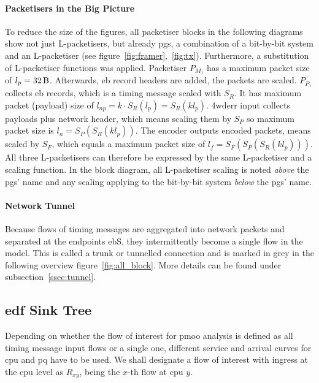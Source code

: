 \paragraph{Packetisers in the Big Picture}
To reduce the size of the figures, all packetiser blocks in the following diagrams show not just L-packetisers, but already \gls{pgs},
a combination of a bit-by-bit system and an L-packetiser (see figure~\ref{fig:framer},~\ref{fig:tx}). Furthermore, a substitution of L-packetiser functions was applied.
Packetiser $P_{M_1}$ has a maximum packet size of $l_p = \SI{32}{\byte}$. Afterwards, \gls{eb} record headers are added, the packets are scaled. $P_{P_1}$ collects \gls{eb} records, which is a timing message scaled with $S_R$.
It has maximum packet (payload) size of $l_{np} = k \cdot S_R(l_p) = S_R(kl_p)$. \gls{4wderr} input collects payloads plus network header, which means scaling them by $S_P$ so maximum packet size is
$l_{n} = S_P(S_R(kl_p))$. The encoder outputs encoded packets,  means scaled by $S_F$, which equals a maximum packet size of $l_{f} = S_F(S_P(S_R(kl_p)))$.
All three L-packetisers can therefore be expressed by the same L-packetiser and a scaling function.  
In the block diagram, all L-packetiser scaling is noted \emph{above} the \gls{pgs}' name
and any scaling applying to the bit-by-bit system \emph{below} the \gls{pgs}' name.
\paragraph{Network Tunnel}
Because flows of timing messages are aggregated into network packets and separated at the endpoints \gls{eb}S, they intermittently become a single flow in the model. This is called a trunk or tunnelled connection
and is marked in grey in the following overview figure~\ref{fig:all_block}. More details can be found under subsection~\ref{ssec:tunnel}.
\subsection{\gls{edf} Sink Tree}
Depending on whether the flow of interest for \gls{pmoo} analysis is defined as all timing message input flows or a single one,
different service and arrival curves for \gls{cpu} and \gls{pq} have to be used. We shall designate a flow of interest with ingress at the \gls{cpu}
level as $R_{xy}$, being the $x$-th flow at \gls{cpu} $y$.

